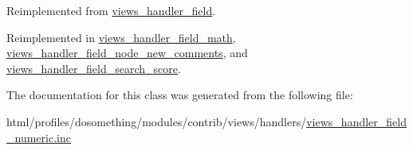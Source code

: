 Reimplemented from \hyperlink{classviews__handler__field_a82ff951c5e9ceb97b2eab86f880cbc1e}{views\_\-handler\_\-field}.

Reimplemented in \hyperlink{classviews__handler__field__math_a2d3ecd4f87873d06e47f9debabd78801}{views\_\-handler\_\-field\_\-math}, \hyperlink{classviews__handler__field__node__new__comments_a6b1e79531ba28eb32e71c7ff2129e82d}{views\_\-handler\_\-field\_\-node\_\-new\_\-comments}, and \hyperlink{classviews__handler__field__search__score_a80a58d69b8a6c7f57da022e88f90e32d}{views\_\-handler\_\-field\_\-search\_\-score}.

The documentation for this class was generated from the following file:\begin{DoxyCompactItemize}
\item 
html/profiles/dosomething/modules/contrib/views/handlers/\hyperlink{views__handler__field__numeric_8inc}{views\_\-handler\_\-field\_\-numeric.inc}\end{DoxyCompactItemize}
